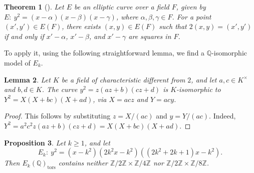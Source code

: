 \documentclass{article}
\theoremstyle{plain}
\newtheorem{theorem}{Theorem}
\newtheorem{lemma}[theorem]{Lemma}
\newtheorem{proposition}[theorem]{Proposition}
\newcommand{\Q}{\mathbb{Q}}
\newcommand{\tors}{\mathrm{tors}}
\begin{document}
\begin{theorem}[{\cite[Ch.~1, Theorem 4.1]{Husemoller2004}}]\label{thm:halvingCrit}
Let \(E\) be an elliptic curve over a field \(F\), given by
\(E:\ y^2=(x-\alpha)(x-\beta)(x-\gamma)\), where
\(\alpha,\beta,\gamma\in F\). For a point \((x',y')\in E(F)\), there exists
\((x,y)\in E(F)\) such that \(2(x,y)=(x',y')\) if and only if
\(x'-\alpha\), \(x'-\beta\), and \(x'-\gamma\) are squares in \(F\).
\end{theorem}

To apply it, using the following straightforward lemma, we find a \(\Q\)-isomorphic model of $E_k$.

\begin{lemma}\label{lem:Qiso}
Let \(K\) be a field of characteristic different from \(2\), and let
\(a,c\in K^\times\) and \(b,d\in K\). The curve
\(y^2=z(az+b)(cz+d)\) is \(K\)-isomorphic to
\(Y^2=X(X+bc)(X+ad)\), via \(X=acz\) and \(Y=acy\).
\end{lemma}

\begin{proof}
This follows by substituting \(z=X/(ac)\) and \(y=Y/(ac)\). Indeed,
\(Y^2=a^2c^2z(az+b)(cz+d)=X(X+bc)(X+ad)\).
\end{proof}

\begin{proposition}\label{prop:no4}
Let \(k\geqslant 1\), and let
\[
E_k:\ y^2=(x-k^2)(2k^2x-k^2)((2k^2+2k+1)x-k^2).
\]
Then \(E_k(\Q)_{\tors}\) contains neither
\(\mathbb Z/2\mathbb Z\times \mathbb Z/4\mathbb Z\) nor
\(\mathbb Z/2\mathbb Z\times \mathbb Z/8\mathbb Z\).
\end{proposition}
\end{document}
